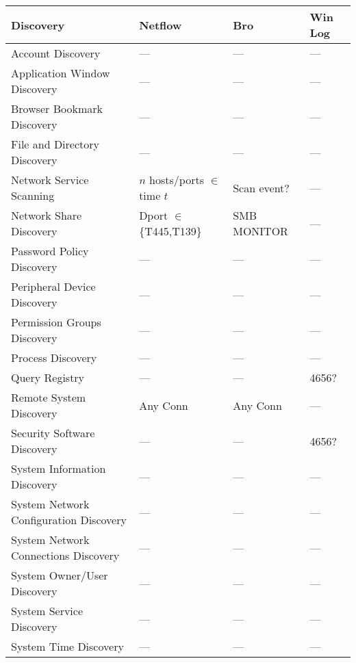 \documentclass[journal]{IEEEtran}
\begin{document}
\begin{table*}[]
\begin{tabular}{|l|l|l|l|}
\rowcolor[HTML]{EFEFEF} 
\textbf{Discovery}		          & \textbf{Netflow} 	&  \textbf{Bro} & \textbf{Win Log} \\\hline
Account Discovery         	  	  & ---       			& 	--- 			&  --- \\\hline                 
Application Window Discovery	  & ---       			& 	--- 			&  --- \\\hline                 
Browser Bookmark Discovery		  & ---       			& 	--- 			&  --- \\\hline                 
File and Directory Discovery	  & ---       			& 	--- 			&  --- \\\hline                 
Network Service Scanning		  & $n$ hosts/ports $\in$ time $t$ & Scan event?			&   --- \\\hline
Network Share Discovery			  & Dport $\in$ \{T445,T139\}       	& SMB MONITOR & --- \\\hline
Password Policy Discovery		  & ---       			& 	--- 			&  --- \\\hline                           
Peripheral Device Discovery       & ---       			& 	--- 			&  --- \\\hline  
Permission Groups Discovery		  & ---       			& 	--- 			&  --- \\\hline                            
Process Discovery                 & ---       			& 	--- 			&  --- \\\hline  
Query Registry					  & ---       			& 	--- 			&  4656? \\\hline                 
Remote System Discovery 	      & Any Conn			   & 	Any Conn				& ---   \\\hline       
Security Software Discovery       & ---       			& 	--- 			& 4656?  \\\hline       
System Information Discovery      & ---       			& 	--- 			&  --- \\\hline          
System Network Configuration Discovery & ---       			& 	--- 			&  --- \\\hline       
System Network Connections Discovery   & ---       			& 	--- 			&  --- \\\hline        
System Owner/User Discovery       & ---       			& 	--- 			&  --- \\\hline         
System Service Discovery          & ---       			& 	--- 			&  --- \\\hline           
System Time Discovery             & ---       			& 	--- 			&  --- \\\hline                 
\end{tabular}
\end{table*}
\end{document}
